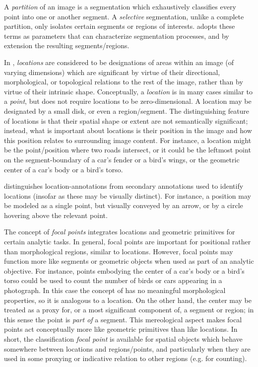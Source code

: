 {\begin{description}
A \textit{partition} of an image is a segmentation 
which exhaustively classifies every point into 
one or another segment.  A \textit{selective} 
segmentation, unlike a complete partition, only 
isolates certain segments or regions of 
interests.  \lAXFI{} adopts these terms 
as parameters that can characterize 
segmentation processes, and by extension the 
resulting segments/regions. 

\item[Locations]  In \AXFI{}, \textit{locations} 
are considered to be designations of areas 
within an image (of varying dimensions) which 
are significant by virtue of their directional, 
morphological, or topological relations to 
the rest of the image, rather than by virtue 
of their intrinsic shape.  Conceptually, 
a \textit{location} is in many cases similar 
to a \textit{point}, but \AXFI{} does not require 
locations to be zero-dimensional.  A location 
may be designated by a small disk, or even a
region/segment.  The distinguishing feature 
of locations is that their spatial shape or extent 
are not semantically significant; instead, 
what is important about locations is their 
position in the image and how this position 
relates to surrounding image content.  For 
instance, a location might be the point/position 
where two roads intersect, or it could 
be the leftmost point on the segment-boundary of 
a car's fender or a bird's wings, or the 
geometric center of a car's body or a bird's torso.

\lAXFI{} distinguishes location-annotations from 
secondary annotations used to identify locations 
(insofar as these may be visually distinct).  For 
instance, a position may be modeled as a single 
point, but visually conveyed by an arrow, or by 
a circle hovering above the relevant point.

\item[Focal Points]  The concept of \textit{focal 
points} integrates locations and geometric primitives 
for certain analytic tasks.  In general, focal points 
are important for positional rather than morphological 
regions, similar to locations.  However, focal points 
may function more like segments or geometric objects 
when used as part of an analytic objective.  For 
instance, points embodying the center of a car's body 
or a bird's torso could be used to count the number 
of birds or cars appearing in a photograph.  
In this case the concept of  has 
no meaningful morphological properties, so it 
is analogous to a location.  On the other hand, the 
center may be treated as a proxy for, or a most 
significant component of, a segment or region; in this 
sense the point is \textit{part of} a segment.  
This mereological aspect makes focal points 
act conceptually more like geometric primitives than 
like locations.  In short, the classification 
\textit{focal point} is available for spatial 
objects which behave somewhere between locations 
and regions/points, and particularly when they 
are used in some proxying or indicative relation 
to other regions (e.g. for counting).  
   

\end{description}}
